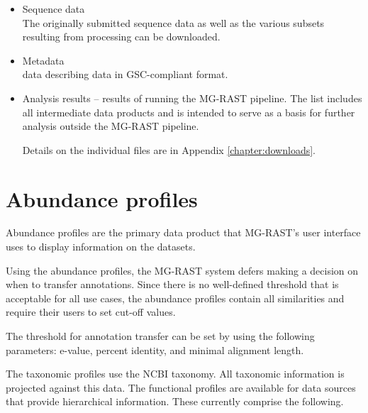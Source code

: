 \documentclass[12pt,fullpage]{report}
\begin{document}
\begin{itemize}

\item Sequence data\\
The originally submitted sequence data as well as the various subsets resulting from processing can be downloaded.

\item Metadata \\
data describing data in GSC-compliant format.

\item Analysis results --
results of running the MG-RAST pipeline. The list includes all intermediate data products and is intended to serve as a basis for further analysis outside the MG-RAST pipeline.

Details on the individual files are in Appendix \ref{chapter:downloads}.
\end{itemize}





\section{Abundance profiles}

Abundance profiles are the primary data product that MG-RAST's user interface uses to display information on the datasets.

Using the abundance profiles, the MG-RAST system defers making a decision on when to transfer annotations. Since there is no well-defined threshold that is acceptable for all use cases, the abundance profiles contain all similarities and require their users to set cut-off values.

The threshold for annotation transfer can be set by using the following parameters:
e-value,
percent identity, and
minimal alignment length.

The taxonomic profiles use the NCBI taxonomy. All taxonomic information is projected against this data.
The functional profiles are available for data sources that provide hierarchical information. These currently comprise the following.
\end{document}
